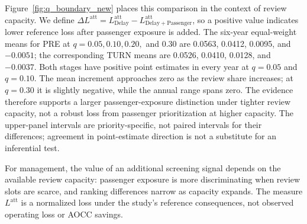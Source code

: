 Figure~\ref{fig:q_boundary_new} places this comparison in the context of review capacity. We define
$\Delta L^{\mathrm{att}}=L^{\mathrm{att}}_{\mathrm{Delay}}-
L^{\mathrm{att}}_{\mathrm{Delay+Passenger}}$, so a positive value indicates lower reference loss after passenger exposure is added. The six-year equal-weight means for PRE at $q=0.05,0.10,0.20,$ and $0.30$ are 0.0563, 0.0412, 0.0095, and $-0.0051$; the corresponding TURN means are 0.0526, 0.0410, 0.0128, and $-0.0037$. Both stages have positive point estimates in every year at $q=0.05$ and $q=0.10$. The mean increment approaches zero as the review share increases; at $q=0.30$ it is slightly negative, while the annual range spans zero. The evidence therefore supports a larger passenger-exposure distinction under tighter review capacity, not a robust loss from passenger prioritization at higher capacity. The upper-panel intervals are priority-specific, not paired intervals for their differences; agreement in point-estimate direction is not a substitute for an inferential test.

For management, the value of an additional screening signal depends on the available review capacity: passenger exposure is more discriminating when review slots are scarce, and ranking differences narrow as capacity expands. The measure $L^{\mathrm{att}}$ is a normalized loss under the study's reference consequences, not observed operating loss or AOCC savings.

